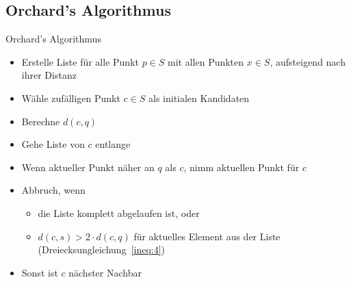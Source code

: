 \documentclass{beamer}
\begin{document}
\subsection{Orchard’s Algorithmus}
\begin{frame}{Orchard’s Algorithmus}
 \begin{itemize}
  \item Erstelle Liste f\"ur alle Punkt $p \in S$ mit allen Punkten $x \in S$, aufsteigend nach ihrer Distanz
  \pause
  \item W\"ahle zufälligen Punkt $c \in S$ als initialen Kandidaten
  \pause
  \item Berechne $d(c, q)$
  \pause
  \item Gehe Liste von $c$ entlange
  \pause
  \item Wenn aktueller Punkt näher an $q$ als $c$, nimm aktuellen Punkt für $c$
  \pause
  \item Abbruch, wenn
    \begin{itemize}
      \item die Liste komplett abgelaufen ist, oder
      \item $d(c, s) > 2 \cdot d(c, q)$ f\"ur aktuelles Element aus der Liste (Dreiecksungleichung~\ref{ineq:4})
    \end{itemize}
   \pause
   \item Sonst ist $c$ nächster Nachbar
 \end{itemize}
\end{frame}
\end{document}
